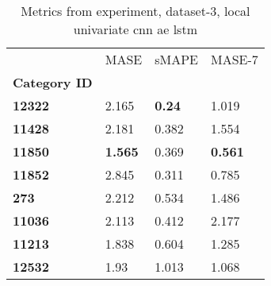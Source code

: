 \begin{table}[H]
\centering
\caption{Metrics from experiment, dataset-3, local univariate cnn ae lstm}
\label{table:local-univariate-cnn-ae-lstm-dataset-3}
\begin{tabular}{llll}
\toprule
{} &            MASE &          sMAPE &          MASE-7 \\
\textbf{Category ID} &                 &                &                 \\
\midrule
\textbf{12322      } &           2.165 &  \textbf{0.24} &           1.019 \\
\textbf{11428      } &           2.181 &          0.382 &           1.554 \\
\textbf{11850      } &  \textbf{1.565} &          0.369 &  \textbf{0.561} \\
\textbf{11852      } &           2.845 &          0.311 &           0.785 \\
\textbf{273        } &           2.212 &          0.534 &           1.486 \\
\textbf{11036      } &           2.113 &          0.412 &           2.177 \\
\textbf{11213      } &           1.838 &          0.604 &           1.285 \\
\textbf{12532      } &            1.93 &          1.013 &           1.068 \\
\bottomrule
\end{tabular}
\end{table}

